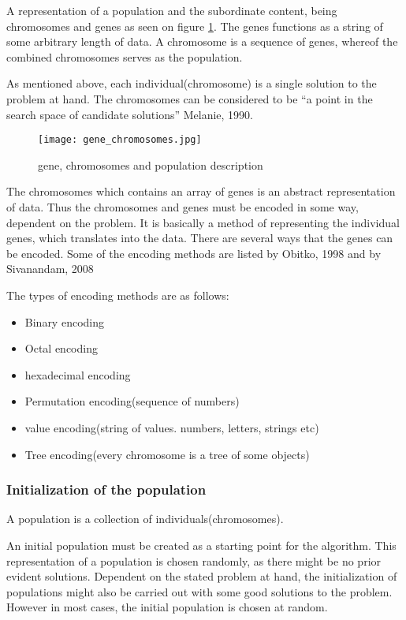 A representation of a population and the subordinate content, being chromosomes and genes as seen on figure \ref{fig:gene}.
The genes functions as a string of some arbitrary length of data. A chromosome is a sequence of genes, whereof the combined chromosomes serves as the population. \cite[pp. 41]{Sivanandam2008}

As mentioned above, each individual(chromosome) is a single solution to the problem at hand. The chromosomes can be considered to be \enquote{a point in the search space of candidate solutions} \cite[pp. 7]{Melanie1990} Melanie, 1990.


\begin{figure}[!htbp]
\centering
\texttt{[image: gene\_chromosomes.jpg]}
\caption{gene, chromosomes and population description}
\label{fig:gene}
\end{figure}

The chromosomes which contains an array of genes is an abstract representation of data. Thus the chromosomes and genes must be encoded in some way, dependent on the problem. It is basically a method of representing the individual genes, which translates into the data.
There are several ways that the genes can be encoded. Some of the encoding methods are listed by Obitko, 1998 \cite{Marek1998} and by Sivanandam, 2008 \cite[pp.43]{Sivanandam2008}

The types of encoding methods are as follows:
\begin{itemize}
\item Binary encoding
\item Octal encoding
\item hexadecimal encoding
\item Permutation encoding(sequence of numbers)
\item value encoding(string of values. numbers, letters, strings etc)
\item Tree encoding(every chromosome is a tree of some objects)
\end{itemize}


\subsubsection*{Initialization of the population}

A population is a collection of individuals(chromosomes).

An initial population must be created as a starting point for the algorithm. This representation of a population is chosen randomly, as there might be no prior evident solutions. Dependent on the stated problem at hand, the initialization of populations might also be carried out with some good solutions to the problem. However in most cases, the initial population is chosen at random. \cite[pp. 41/42]{Sivanandam2008}


